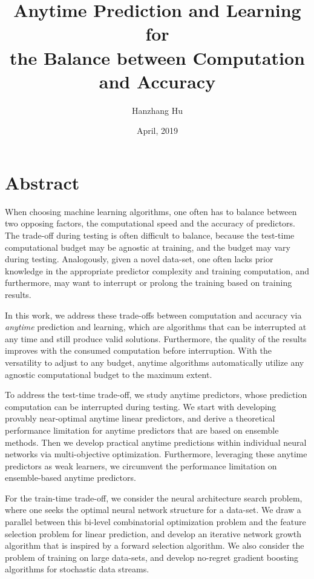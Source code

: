 \documentclass[review,12pt]{cmuthesis}
\title{
{Anytime Prediction and Learning for \\
the Balance between Computation and Accuracy}\\
}
\author{
Hanzhang Hu}
\date{April, 2019}
\begin{document}
\maketitle


\chapter*{Abstract}
When choosing machine learning algorithms, one often has to balance between two opposing factors, 
the computational speed and the accuracy of predictors. 
The trade-off during testing is often difficult to balance, 
because the test-time computational budget may be agnostic
at training, and the budget may vary during testing. 
Analogously, given a novel data-set, one often lacks prior knowledge in the appropriate predictor complexity
and training computation, and furthermore, may want to interrupt or prolong the training 
based on training results. 

In this work, we address these trade-offs between computation and accuracy via \emph{anytime} prediction and 
learning, which are algorithms that can be interrupted at any time and still produce valid solutions. 
Furthermore, the quality of the results improves with the consumed computation before interruption. 
With the versatility to adjust to any budget, anytime algorithms automatically
 utilize any agnostic computational budget to the maximum extent.

To address the test-time trade-off, we study anytime predictors, whose prediction computation can be interrupted during testing. 
We start with developing provably near-optimal anytime linear predictors, and derive a theoretical performance limitation
for anytime predictors that are based on ensemble methods. Then we develop practical 
anytime predictions within individual neural networks via multi-objective optimization. 
Furthermore, leveraging these anytime predictors as weak learners, we circumvent the
performance limitation on ensemble-based anytime predictors.

For the train-time trade-off, we consider the neural architecture search problem, where
one seeks the optimal neural network structure for a data-set. We draw a parallel between this bi-level 
combinatorial optimization problem and the feature selection problem for linear prediction, 
and develop an iterative network growth algorithm that is inspired by a forward selection algorithm. 
We also consider the problem of training on large data-sets, and develop 
no-regret gradient boosting algorithms for stochastic data streams.
\end{document}
